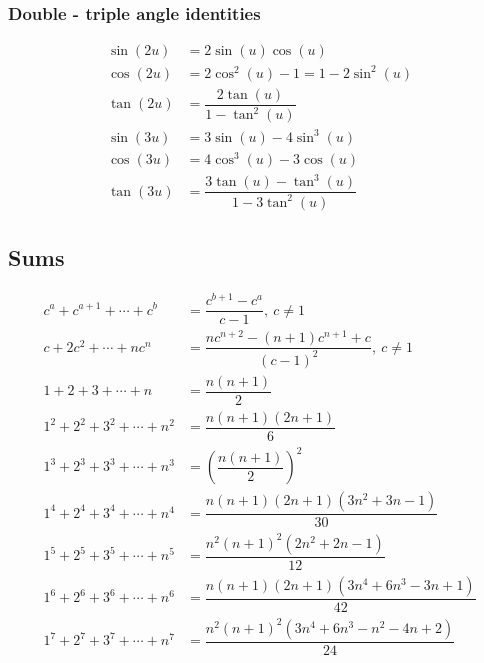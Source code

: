 \subsubsection{Double - triple angle identities}
\vspace{-0.6cm}
\begin{align*}
  \sin(2u) &= 2\sin(u)\cos(u) \\
  \cos(2u) &= 2\cos^2(u) - 1 = 1 - 2\sin^2(u) \\
  \tan(2u) &= \dfrac{2\tan(u)}{1-\tan^2(u)} \\
  \sin(3u) &= 3\sin(u) - 4\sin^3(u) \\
  \cos(3u) &= 4\cos^3(u) - 3\cos(u) \\
  \tan(3u) &= \dfrac{3\tan(u) - \tan^3(u)}{1 - 3\tan^2(u)}
\end{align*}

\subsection{Sums}
\vspace{-0.6cm}
\begin{align*}
  c^{a} + c^{a + 1} + \cdots + c^{b} &= \dfrac{c^{b + 1} - c^{a}}{c - 1},\ c \neq 1 \\
  c + 2c^{2} + \cdots + nc^{n} &= \dfrac{nc^{n + 2} - (n + 1)c^{n + 1} + c}{(c - 1)^2},\ c \neq 1 \\
  1 + 2 + 3 + \cdots + n &= \dfrac{n(n + 1)}{2} \\
  1^2 + 2^2 + 3^2 + \cdots + n^2 &= \dfrac{n(n + 1)(2n + 1)}{6} \\
  1^3 + 2^3 + 3^3 + \cdots + n^3 &= \left(\dfrac{n(n + 1)}{2}\right)^2 \\
  1^4 + 2^4 + 3^4 + \cdots + n^4 &= \dfrac{n(n + 1)(2n + 1)(3n^2 + 3n - 1)}{30} \\
  1^5 + 2^5 + 3^5 + \cdots + n^5 &= \dfrac{n^2(n + 1)^2(2n^2 + 2n - 1)}{12} \\
  1^6 + 2^6 + 3^6 + \cdots + n^6 &= \dfrac{n(n + 1)(2n + 1)(3n^4 + 6n^3 - 3n + 1)}{42} \\
  1^7 + 2^7 + 3^7 + \cdots + n^7 &= \dfrac{n^2(n + 1)^2(3n^4 + 6n^3 - n^2 - 4n + 2)}{24}
\end{align*}


